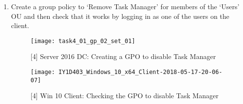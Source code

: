 \begin{enumerate}[series=task4methodology1]
  \item Create a group policy to `Remove Task Manager' for members of the `Users' OU and then check that it works by logging in as one of the users on the client.
    \begin{figure}[H]
      \centering
      \captionsetup{skip=2pt}
      \texttt{[image: task4\_01\_gp\_02\_set\_01]}
      \caption{[4] Server 2016 DC: Creating a GPO to disable Task Manager}
      \label{fig:task4:gp2a}
    \end{figure}
    \begin{figure}[H]
      \centering
      \captionsetup{skip=2pt}
      \texttt{[image: IY1D403\_Windows\_10\_x64\_Client-2018-05-17-20-06-07]}
      \caption{[4] Win 10 Client: Checking the GPO to disable Task Manager}
      \label{fig:task4:gp2b}
    \end{figure}
\end{enumerate}
